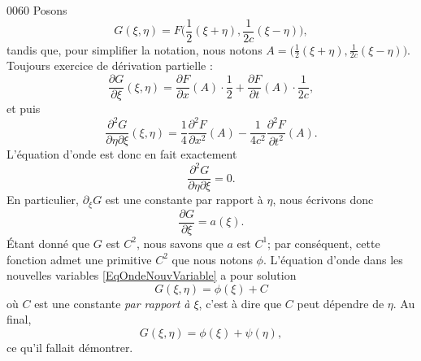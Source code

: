 \begin{corrige}{0060}
Posons
\begin{equation}
	G(\xi,\eta)=F\big(\frac{ 1 }{2}(\xi+\eta),\frac{1}{ 2c }(\xi-\eta) \big),
\end{equation}
tandis que, pour simplifier la notation, nous notons $A=\big( \frac{ 1 }{2}(\xi+\eta),\frac{1}{ 2c }(\xi-\eta)\big)$. Toujours exercice de dérivation partielle :
\begin{equation}
	\frac{ \partial G }{ \partial \xi }(\xi,\eta)=\frac{ \partial F }{ \partial x }(A)\cdot\frac{ 1 }{2}+\frac{ \partial F }{ \partial t }(A)\cdot\frac{1}{ 2c },
\end{equation}
et puis
\begin{equation}
	\frac{ \partial^2G  }{ \partial\eta\partial\xi }(\xi,\eta)=\frac{1}{ 4 }\frac{ \partial^2F  }{ \partial x^2 }(A)-\frac{1}{ 4c^2 }\frac{ \partial^2F  }{ \partial t^2 }(A).
\end{equation}
L'équation d'onde est donc en fait exactement
\begin{equation}		\label{EqOndeNouvVariable}
	\frac{ \partial^2G  }{ \partial \eta\partial\xi }=0.
\end{equation}
En particulier, $\partial_{\xi}G$ est une constante par rapport à $\eta$, nous écrivons donc 
\begin{equation}
	\frac{ \partial G }{ \partial \xi }=a(\xi).
\end{equation}
Étant donné que $G$ est $C^2$, nous savons que $a$ est $C^1$; par conséquent, cette fonction admet une primitive $C^2$ que nous notons $\phi$. L'équation  d'onde dans les nouvelles variables \eqref{EqOndeNouvVariable} a pour solution
\begin{equation}
	G(\xi,\eta)=\phi(\xi)+C
\end{equation}
où $C$ est une constante \emph{par rapport à $\xi$}, c'est à dire que $C$ peut dépendre de $\eta$. Au final,
\begin{equation}
		G(\xi,\eta)=\phi(\xi)+\psi(\eta),
\end{equation}
ce qu'il fallait démontrer.


\end{corrige}
